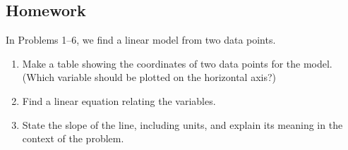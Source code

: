 \documentclass[10pt,]{book}
\theoremstyle{plain}
\theoremstyle{definition}
\theoremstyle{definition}
\theoremstyle{definition}
\theoremstyle{definition}
\numberwithin{equation}{part}
\begin{document}
\subsection[{Homework}]{Homework}\label{section-1-6-exercises}
\hypertarget{exercisegroup-46}{}\par\noindent In Problems 1–6, we find a linear model from two data points. \leavevmode%
\begin{enumerate}[label=*\alph**]
\item\hypertarget{li-1357}{}Make a table showing the coordinates of two data points for the model. (Which variable should be plotted on the horizontal axis?)%
\item\hypertarget{li-1358}{}Find a linear equation relating the variables.%
\item\hypertarget{li-1359}{}State the slope of the line, including units, and explain its meaning in the context of the problem.%
\end{enumerate}
%
\end{document}
